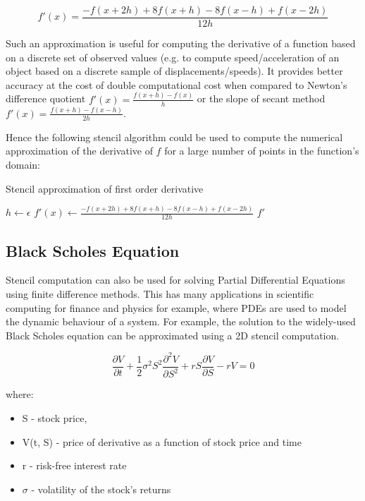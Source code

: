 \begin{equation}
  f'(x) = \frac{-f(x + 2h) + 8f(x+h) - 8f(x-h) + f(x - 2h)}{12h}
\end{equation}

Such an approximation is useful for computing the derivative of a
function based on a discrete set of observed values (e.g. to compute
speed/acceleration of an object based on a discrete sample of
displacements/speeds). It provides better accuracy at the cost of
double computational cost when compared to Newton's difference
quotient $f'(x) = \frac{f(x + h) - f(x)}{h}$ or the slope of secant
method $f'(x)=\frac{f(x+h) - f(x - h)}{2h}$.

Hence the following stencil algorithm could be used to compute the
numerical approximation of the derivative of $f$ for a large number of
points in the function's domain:

\begin{algorithm}
  \caption{Stencil approximation of first order derivative}
  \begin{algorithmic}
    \State $h \gets \epsilon$
    \State $f'(x) \gets  \frac{-f(x + 2h) + 8f(x+h) - 8f(x-h) + f(x - 2h)}{12h}$
    \EndFor
    \State \Return $f'$
    \EndFunction
  \end{algorithmic}
\end{algorithm}

\subsection{Black Scholes Equation}

Stencil computation can also be used for solving Partial Differential
Equations using finite difference methods. This has many applications
in scientific computing for finance and physics for example, where
PDEs are used to model the dynamic behaviour of a system. For example,
the solution to the widely-used Black Scholes equation can be
approximated using a 2D stencil computation.

\begin{equation}
  \frac{\partial V}{\partial t} + \frac{1}{2}\sigma^2S^2\frac{\partial^2 V}{\partial S^2} + rS\frac{\partial V}{\partial S} -rV = 0
\end{equation}

where:
\begin{itemize}
\item S - stock price,
\item V(t, S) - price of derivative as a function of stock price and time
\item r - risk-free interest rate
\item $\sigma$ - volatility of the stock's returns
\end{itemize}

